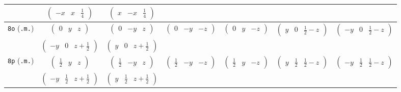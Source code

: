 \documentclass[fleqn,9pt,landscape]{jsarticle}
\begin{document}
\begin{center}
\begin{longtable}{ccccccc}
& $ \begin{pmatrix} - x & x & \frac{1}{4} \end{pmatrix} $ & $ \begin{pmatrix} x & - x & \frac{1}{4} \end{pmatrix} $ & $  $ & $  $ & $  $ & $  $ \\ \hline
{\tt 8o} ({\tt .m.}) & $ \begin{pmatrix} 0 & y & z \end{pmatrix} $ & $ \begin{pmatrix} 0 & - y & z \end{pmatrix} $ & $ \begin{pmatrix} 0 & - y & - z \end{pmatrix} $ & $ \begin{pmatrix} 0 & y & - z \end{pmatrix} $ & $ \begin{pmatrix} y & 0 & \frac{1}{2} - z \end{pmatrix} $ & $ \begin{pmatrix} - y & 0 & \frac{1}{2} - z \end{pmatrix} $ \\
& $ \begin{pmatrix} - y & 0 & z + \frac{1}{2} \end{pmatrix} $ & $ \begin{pmatrix} y & 0 & z + \frac{1}{2} \end{pmatrix} $ & $  $ & $  $ & $  $ & $  $ \\ \hline
{\tt 8p} ({\tt .m.}) & $ \begin{pmatrix} \frac{1}{2} & y & z \end{pmatrix} $ & $ \begin{pmatrix} \frac{1}{2} & - y & z \end{pmatrix} $ & $ \begin{pmatrix} \frac{1}{2} & - y & - z \end{pmatrix} $ & $ \begin{pmatrix} \frac{1}{2} & y & - z \end{pmatrix} $ & $ \begin{pmatrix} y & \frac{1}{2} & \frac{1}{2} - z \end{pmatrix} $ & $ \begin{pmatrix} - y & \frac{1}{2} & \frac{1}{2} - z \end{pmatrix} $ \\
& $ \begin{pmatrix} - y & \frac{1}{2} & z + \frac{1}{2} \end{pmatrix} $ & $ \begin{pmatrix} y & \frac{1}{2} & z + \frac{1}{2} \end{pmatrix} $ & $  $ & $  $ & $  $ & $  $ \\ \hline

\end{longtable}
\end{center}
\end{document}
